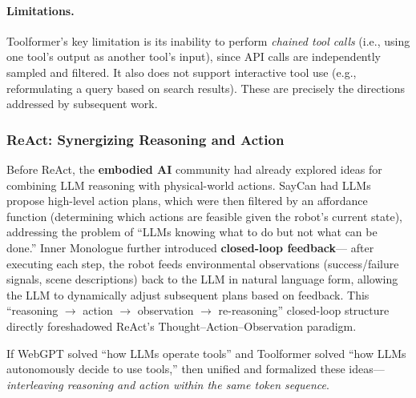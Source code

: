 \paragraph{Limitations.} Toolformer's key limitation is its inability to perform \emph{chained tool calls} (i.e., using one tool's output as another tool's input), since API calls are independently sampled and filtered. It also does not support interactive tool use (e.g., reformulating a query based on search results). These are precisely the directions addressed by subsequent work.

\subsubsection{ReAct: Synergizing Reasoning and Action}

Before ReAct, the \textbf{embodied AI} community had already explored ideas for combining LLM reasoning with physical-world actions.
SayCan \cite{ahn2022saycan} had LLMs propose high-level action plans,
which were then filtered by an affordance function (determining which actions are feasible given the robot's current state),
addressing the problem of ``LLMs knowing what to do but not what can be done.''
Inner Monologue \cite{huang2022innermonologue} further introduced \textbf{closed-loop feedback}---
after executing each step, the robot feeds environmental observations (success/failure signals, scene descriptions)
back to the LLM in natural language form, allowing the LLM to dynamically adjust subsequent plans based on feedback.
This ``reasoning $\rightarrow$ action $\rightarrow$ observation $\rightarrow$ re-reasoning'' closed-loop structure
directly foreshadowed ReAct's Thought--Action--Observation paradigm.

If WebGPT solved ``how LLMs operate tools'' and Toolformer solved ``how LLMs autonomously decide to use tools,'' then  unified and formalized these ideas---\emph{interleaving reasoning and action within the same token sequence}.

